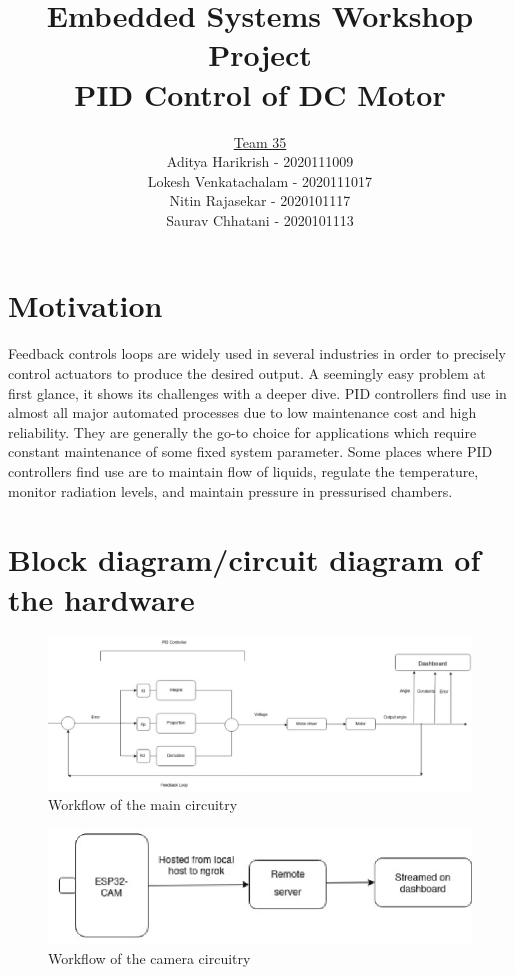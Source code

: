 \documentclass[12pt, a4paper]{article}
\title{Embedded Systems Workshop Project\\PID Control of DC Motor}
\author{\uline{Team 35}\\Aditya Harikrish - 2020111009\\Lokesh Venkatachalam - 2020111017\\Nitin Rajasekar - 2020101117\\Saurav Chhatani - 2020101113}
\date{}
\theoremstyle{definition}
\theoremstyle{remark}
\begin{document}
\maketitle
\tableofcontents
\newpage

\section{Motivation}
Feedback controls loops are widely used in several industries in order to precisely control actuators to produce the desired output.
A seemingly easy problem at first glance, it shows its challenges with a deeper dive.
PID controllers find use in almost all major automated processes due to low maintenance cost and high reliability.
They are generally the go-to choice for applications which require constant maintenance of some fixed system parameter.
Some places where PID controllers find use are to maintain flow of liquids, regulate the temperature, monitor radiation levels, and maintain pressure in pressurised chambers.

\section{Block diagram/circuit diagram of the hardware}
\begin{figure}[!h]
    \centering
    \includegraphics[scale=0.2]{img/block1.png}
    \caption{Workflow of the main circuitry}
    \label{fig:block1}
\end{figure}

\begin{figure}[!h]
    \centering
    \includegraphics[scale=0.2]{img/block2.png}
    \caption{Workflow of the camera circuitry}
    \label{fig:block2}
\end{figure}
\end{document}

